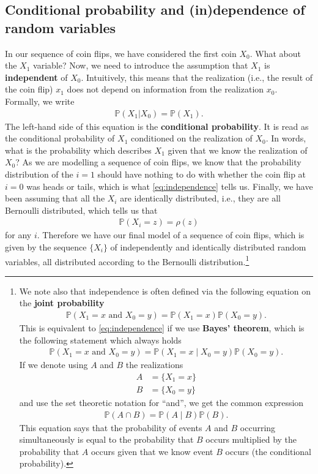 \documentclass[11pt]{article}
\begin{document}
\subsection{Conditional probability and (in)dependence of random variables}
\label{sec:org982e7e5}
In our sequence of coin flips, we have considered the first coin \(X_{0}\). What
about the \(X_{1}\) variable? Now, we need to introduce the assumption that
\(X_{1}\) is \textbf{independent} of \(X_{0}\). Intuitively, this means that the
realization (i.e., the result of the coin flip) \(x_{1}\) does not depend on
information from the realization \(x_{0}\). Formally, we write
\begin{align}
\label{eq:independence}
\mathbb{P}(X_{1} | X_{0}) = \mathbb{P}(X_{1}).
\end{align}
The left-hand side of this equation is the \textbf{conditional probability}. It is read
as the conditional probability of \(X_{1}\) conditioned on the realization of
\(X_{0}\). In words, what is the probability which describes \(X_{1}\) given
that we know the realization of \(X_{0}\)? As we are modelling a sequence of
coin flips, we know that the probability distribution of the \(i=1\) should have
nothing to do with whether the coin flip at \(i = 0\) was heads or tails, which
is what \eqref{eq:independence} tells us. Finally, we have been assuming that all the
\(X_{i}\) are identically distributed, i.e., they are all Bernoulli distributed,
which tells us that
\begin{align*}
\mathbb{P}(X_{i} = z) = \rho(z)
\end{align*}
for any \(i\). Therefore we have our final model of a sequence of coin flips,
which is given by the sequence \(\{X_{i}\}\) of independently and identically
distributed random variables, all distributed according to the Bernoulli
distribution.\footnote{We note also that independence is often defined via the following equation on
the \textbf{joint probability}
\begin{align*}
\mathbb{P}(X_{1} = x\text{ and }X_{0} = y) = \mathbb{P}(X_{1} = x)\mathbb{P}(X_{0} = y).
\end{align*}
This is equivalent to \eqref{eq:independence} if we use \textbf{Bayes' theorem}, which
is the following statement which always holds
\begin{align*}
\mathbb{P}(X_{1} = x \text{ and } X_{0} = y) = \mathbb{P}(X_{1} = x \mid X_{0} = y)\mathbb{P}(X_{0} = y).
\end{align*}
If we denote using \(A\) and \(B\) the realizations
\begin{align*}
A &= \{X_{1} = x\} \\
B &= \{X_{0} = y\}
\end{align*}
and use the set theoretic notation for ``and'', we get the common expression
\begin{align*}
\mathbb{P}(A \cap B) = \mathbb{P}(A \mid B)\mathbb{P}(B).
\end{align*}
This equation says that the probability of events \(A\) and \(B\) occurring
simultaneously is equal to the probability that \(B\) occurs multiplied by the
probability that \(A\) occurs given that we know event \(B\) occurs (the
conditional probability).}
\end{document}
